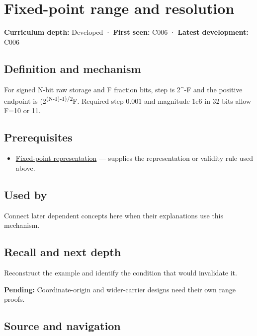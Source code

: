 \hypertarget{appendix-ceb4c4a9b5a1}{}\label{referencestart:appendix-ceb4c4a9b5a1}
\section{Fixed-point range and resolution}\label{appendix-ceb4c4a9b5a1-fixed-point-range-and-resolution}

\textbf{Curriculum depth:} Developed · \textbf{First seen:} C006 · \textbf{Latest development:} C006

\subsection{Definition and mechanism}\label{appendix-ceb4c4a9b5a1-definition-and-mechanism}

For signed N-bit raw storage and F fraction bits, step is 2\^{}-F and the positive endpoint is (2\textsuperscript{(N-1)-1)/2}F. Required step 0.001 and magnitude 1e6 in 32 bits allow F=10 or 11.

\subsection{Prerequisites}\label{appendix-ceb4c4a9b5a1-prerequisites}

\begin{itemize}
\tightlist
\item
  \hyperref[appendix-1d0dbe8924cc]{Fixed-point representation} --- supplies the representation or validity rule used above.
\end{itemize}

\subsection{Used by}\label{appendix-ceb4c4a9b5a1-used-by}

Connect later dependent concepts here when their explanations use this mechanism.

\subsection{Recall and next depth}\label{appendix-ceb4c4a9b5a1-recall-and-next-depth}

Reconstruct the example and identify the condition that would invalidate it.

\textbf{Pending:} Coordinate-origin and wider-carrier designs need their own range proofs.

\subsection{Source and navigation}\label{appendix-ceb4c4a9b5a1-source-and-navigation}

